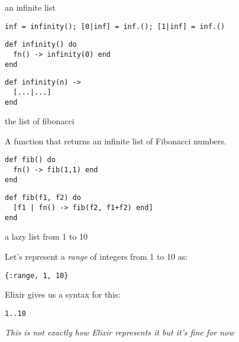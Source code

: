 \begin{frame}[fragile]{an infinite list}

\pause\vspace{20pt}

\verb+inf = infinity()+\pause \verb+; [0|inf] = inf.()+\pause \verb+; [1|inf] = inf.()+

\pause
\begin{verbatim}
def infinity() do 
  fn() -> infinity(0) end 
end
\end{verbatim}
\pause
\begin{verbatim}
def infinity(n) -> 
  [...|...] 
end
\end{verbatim}

\end{frame}


\begin{frame}[fragile]{the list of fibonacci }

A function that returns an infinite list of Fibonacci numbers.

\pause\vspace{20pt}

\begin{verbatim}
def fib() do 
  fn() -> fib(1,1) end 
end
\end{verbatim}
\pause
\begin{verbatim}
def fib(f1, f2) do
  [f1 | fn() -> fib(f2, f1+f2) end]
end
\end{verbatim}

\end{frame}

\begin{frame}{a lazy list from 1 to 10}

  Let's represent a {\em range} of integers from 1 to 10 as:

  \vspace{10pt}\hspace{20pt} {\tt \{:range, 1, 10\}}

  \vspace{10pt}\pause

  Elixir gives us a syntax for this:

    \vspace{10pt}\hspace{20pt} {\tt 1..10}
  

    
  \vspace{40pt}\pause
  {\em This is not exactly how Elixir represents it but it's fine for now}

\end{frame}



